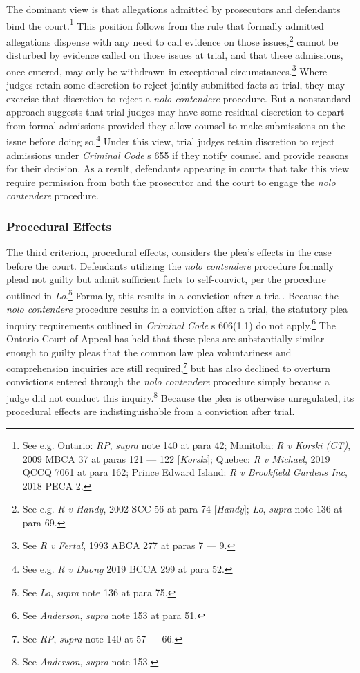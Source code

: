The dominant view is that allegations admitted by prosecutors and defendants bind the court.\footnote{See e.g. Ontario: \textit{RP}, \textit{supra} note 140 at para 42; Manitoba: \textit{R v Korski (CT)}, 2009 MBCA 37 at paras 121 — 122 [\textit{Korski}]; Quebec: \textit{R v Michael}, 2019 QCCQ 7061 at para 162; Prince Edward Island: \textit{R v Brookfield Gardens Inc}, 2018 PECA 2.} This position follows from the rule that formally admitted allegations dispense with any need to call evidence on those issues,\footnote{See e.g. \textit{R v Handy}, 2002 SCC 56 at para 74 [\textit{Handy}]; \textit{Lo}, \textit{supra} note 136 at para 69.} cannot be disturbed by evidence called on those issues at trial, and that these admissions, once entered, may only be withdrawn in exceptional circumstances.\footnote{See \textit{R v Fertal}, 1993 ABCA 277 at paras 7 — 9.} Where judges retain some discretion to reject jointly-submitted facts at trial, they may exercise that discretion to reject a \textit{nolo contendere} procedure. But a nonstandard approach suggests that trial judges may have some residual discretion to depart from formal admissions provided they allow counsel to make submissions on the issue before doing so.\footnote{See e.g. \textit{R v Duong} 2019 BCCA 299 at para 52.} Under this view, trial judges retain discretion to reject admissions under \textit{Criminal Code} s 655 if they notify counsel and provide reasons for their decision. As a result, defendants appearing in courts that take this view require permission from both the prosecutor and the court to engage the \textit{nolo contendere} procedure.

\subsubsection{Procedural Effects}

The third criterion, procedural effects, considers the plea's effects in the case before the court. Defendants utilizing the \textit{nolo contendere} procedure formally plead not guilty but admit sufficient facts to self-convict, per the procedure outlined in \textit{Lo}.\footnote{See \textit{Lo}, \textit{supra} note 136 at para 75.} Formally, this results in a conviction after a trial. Because the \textit{nolo contendere} procedure results in a conviction after a trial, the statutory plea inquiry requirements outlined in \textit{Criminal Code} s 606(1.1) do not apply.\footnote{See \textit{Anderson}, \textit{supra} note 153 at para 51.} The Ontario Court of Appeal has held that these pleas are substantially similar enough to guilty pleas that the common law plea voluntariness and comprehension inquiries are still required,\footnote{See \textit{RP}, \textit{supra} note 140 at 57 — 66.} but has also declined to overturn convictions entered through the \textit{nolo contendere} procedure simply because a judge did not conduct this inquiry.\footnote{See \textit{Anderson}, \textit{supra} note 153.} Because the plea is otherwise unregulated, its procedural effects are indistinguishable from a conviction after trial.

